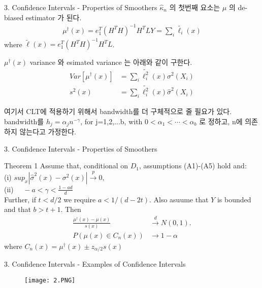 \documentclass[mathserif]{beamer}
\begin{document}
\begin{frame}{3. Confidence Intervals - Properties of Smoothers}
$\hat{\kappa}_n$ 의 첫번째 요소는  $\mu$ 의 de-biased estimator 가 된다.
\begin{align*}
\mu^\dag(x) = e_1^T(H^TH)^{-1}H^TLY = \sum_i \tilde{\ell_i}(x)
\end{align*}
where $\tilde{\ell}(x) = e_1^T(H^TH)^{-1}H^TL$.

\vspace{3mm}

$\mu^\dag(x)$ variance 와 esimated variance 는 아래와 같이 구한다.
\begin{align*}
    Var[\mu^\dag(x)] & = \sum_i \tilde{\ell_i^2}(x)\sigma^2(X_i)\\
    s^2(x) & = \sum_i \tilde{\ell_i^2}(x)\hat{\sigma}^2(X_i)
\end{align*}

여기서 CLT에 적용하기 위해서 bandwidth를 더 구체적으로 줄 필요가 있다. bandwidth를 $h_j=\alpha_jn^{-\gamma}$, for j=1,2,...b, with $0<\alpha_1<\cdots<\alpha_b$ 로 정하고, n에 의존하지 않는다고 가정한다.

\end{frame}



\begin{frame}{3. Confidence Intervals - Properties of Smoothers}
\begin{tcolorbox}[
  colback=Magenta!5!white,
  colframe=Magenta!75!black,
  title={Assumptions}]
Theorem 1  Assume that, conditional on $D_1$, assumptions (A1)-(A5) hold and:\\
(i) \quad $sup_x|\hat{\sigma}^2(x) - \sigma^2(x)| \overset{p}{\to} 0,$\\
(ii) $\quad -a < \gamma < \frac{1-ad}{d}$\\

Further, if $t<d/2$ we require $a< 1/(d-2t)$. Also asuume that $Y$ is bounded and that $b>t+1$. Then
\begin{align*}
    \frac{\mu^\dag(x)-\mu(x)}{s(x)} & \overset{d}{\to} N(0,1).\\
    P(\mu(x) \in C_n(x)) & \rightarrow 1-\alpha
\end{align*}
where $C_n(x) = \mu^\dag(x) \pm z_{\alpha/2}s(x)$ 
\end{tcolorbox}
\end{frame}

\begin{frame}{3. Confidence Intervals - Examples of Confidence Intervals}
\begin{figure}
        \centering
        \texttt{[image: 2.PNG]}
    \end{figure}
\end{frame}
\end{document}
